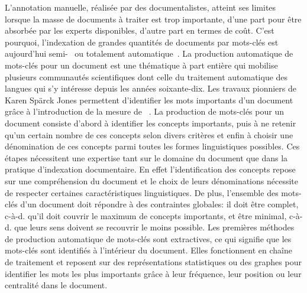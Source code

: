 L'annotation manuelle, réalisée par des documentalistes, atteint ses limites lorsque la masse de documents à traiter est trop importante, d'une part pour être absorbée par les experts disponibles, d'autre part en termes de coût.
C'est pourquoi, l'indexation de grandes quantités de documents par mots-clés est aujourd'hui semi-~\cite{mork_nlm_2013} ou totalement automatique~\cite{cuxac_archives_2017}.
La production automatique de mots-clés pour un document est une thématique à part entière qui mobilise plusieurs communautés scientifiques dont celle du traitement automatique des langues qui s'y intéresse depuis les années soixante-dix.
Les travaux pionniers de Karen Spärck Jones permettent d'identifier les mots importants d'un document grâce à l'introduction de la mesure de \tfidf{}~\cite{jones_statistical_1972}.
La production de mots-clés pour un document consiste d'abord à identifier les concepts importants, puis à ne retenir qu'un certain nombre de ces concepts selon divers critères et enfin à choisir une dénomination de ces concepts parmi toutes les formes linguistiques possibles.
Ces étapes nécessitent une expertise tant sur le domaine du document que dans la pratique d'indexation documentaire. En effet l'identification des concepts repose sur une compréhension du document et le choix de leurs dénominations nécessite de respecter certaines caractéristiques linguistiques.
De plus, l'ensemble des mots-clés d'un document doit répondre à des contraintes globales: il doit être complet, c-à-d. qu'il doit couvrir le maximum de concepts importants, et être minimal, c-à-d. que leurs sens doivent se recouvrir le moins possible.
%
Les premières méthodes de production automatique de mots-clés sont extractives, ce qui signifie que les mots-clés sont identifiés à l'intérieur du document. Elles fonctionnent en chaîne de traitement et reposent sur des représentations statistiques ou des graphes pour identifier les mots les plus importants grâce à leur fréquence, leur position ou leur centralité dans le document.

